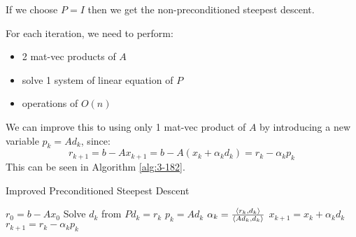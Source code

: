 \documentclass[../main/main.tex]{subfiles}
\begin{document}
\begin{remark}
  If we choose $P=I$ then we get the non-preconditioned steepest descent.
\end{remark}
  For each iteration, we need to perform:
\begin{itemize}
  \item 2 mat-vec products of $A$
        \item solve 1 system of linear equation of $P$
        \item operations of $O(n)$
\end{itemize}
We can improve this to using only 1 mat-vec product of $A$ by introducing a new variable $p_{k} = Ad_{k}$, since: \[
r_{k+1} = b-Ax_{k+1} = b - A(x_{k}+\alpha_{k} d_{k}) = r_{k}-\alpha_{k}p_{k}
\]This can be seen in Algorithm \ref{alg:3-182}.
\begin{algorithm}[h!]
  \caption{Improved Preconditioned Steepest Descent}\label{alg:3-182}
  \begin{algorithmic}[1]
   \State $r_{0} = b-Ax_{0}$
   \State Solve $d_{k}$ from $Pd_{k}=r_{k}$
   \State $p_{k}=Ad_{k}$
  \State $\alpha _{k} = \frac{\left\langle{r_{k}},{d_{k}}\right\rangle}{\left\langle{Ad_{k}},{d_{k}}\right\rangle} $
  \State $x_{k+1}= x_{k}+\alpha _{k}d_{k}$
  \State $r_{k+1}=r_{k}-\alpha_{k}p_{k}$
   \EndFor
  \end{algorithmic}
\end{algorithm}
\end{document}
